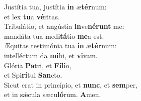 \evenverse Justítia tua, justítia \textbf{in} æ\textbf{tér}num:~\*\\
\evenverse et lex \textbf{tu}a \textbf{vé}ritas.\\
\oddverse Tribulátio, et angústia \textbf{in}ve\textbf{né}\textbf{runt} me:~\*\\
\oddverse mandáta tua medi\textbf{tá}tio \textbf{me}a est.\\
\evenverse Æquitas testimónia tua \textbf{in} æ\textbf{tér}num:~\*\\
\evenverse intelléctum da \textbf{mi}hi, et \textbf{vi}vam.\\
\oddverse Glória \textbf{Pa}tri, et \textbf{Fí}\textbf{li}o,~\*\\
\oddverse et Spi\textbf{rí}tui \textbf{San}cto.\\
\evenverse Sicut erat in princípio, et \textbf{nunc}, et \textbf{sem}per,~\*\\
\evenverse et in sǽcula sæcu\textbf{ló}rum. \textbf{A}men.\\
